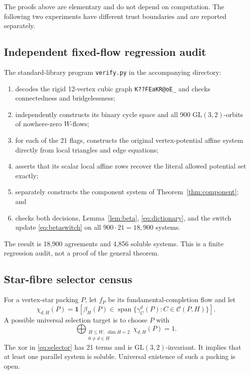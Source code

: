 \documentclass[11pt]{article}
\theoremstyle{definition}
\theoremstyle{remark}
\newcommand{\C}{\mathcal C}
\newcommand{\Span}{\operatorname{span}}
\newcommand{\one}{\mathbf 1}
\numberwithin{equation}{section}
\begin{document}
The proofs above are elementary and do not depend on computation.  The
following two experiments have different trust boundaries and are
reported separately.

\subsection{Independent fixed-flow regression audit}

The standard-library program \texttt{verify.py} in the accompanying
directory:
\begin{enumerate}
\item decodes the rigid 12-vertex cubic graph
      \texttt{K??FEaKR@oE\_} and checks connectedness and bridgelessness;
\item independently constructs its binary cycle space and all 900
      \(\mathrm{GL}(3,2)\)-orbits of nowhere-zero \(W\)-flows;
\item for each of the 21 flags, constructs the original vertex-potential
      affine system directly from local triangles and edge equations;
\item asserts that its scalar local affine rows recover the literal
      allowed potential set exactly;
\item separately constructs the component system of
      Theorem~\ref{thm:component}; and
\item checks both decisions, Lemma~\ref{lem:beta},
      \eqref{eq:dictionary}, and the switch update
      \eqref{eq:betaswitch} on all \(900\cdot21=18{,}900\) systems.
\end{enumerate}
The result is 18,900 agreements and 4,856 soluble systems.  This is a
finite regression audit, not a proof of the general theorem.

\subsection{Star-fibre selector census}

For a vertex-star packing \(P\), let \(f_P\) be its
fundamental-completion flow and let
\[
 \chi_{d,H}(P)=
 \one\!\left[\beta_H(P)\in
       \Span\{\gamma_C^d(P):C\in\C(P,H)\}\right].
\]
A possible universal selection target is to choose \(P\) with
\begin{equation}
       \bigoplus_{\substack{H\le W,\ \dim H=2\\0\ne d\in H}}
       \chi_{d,H}(P)=1.                                     \label{eq:selector}
\end{equation}
The xor in \eqref{eq:selector} has 21 terms and is
\(\mathrm{GL}(3,2)\)-invariant.  It implies that at least one parallel
system is soluble.  Universal existence of such a packing is open.
\end{document}
